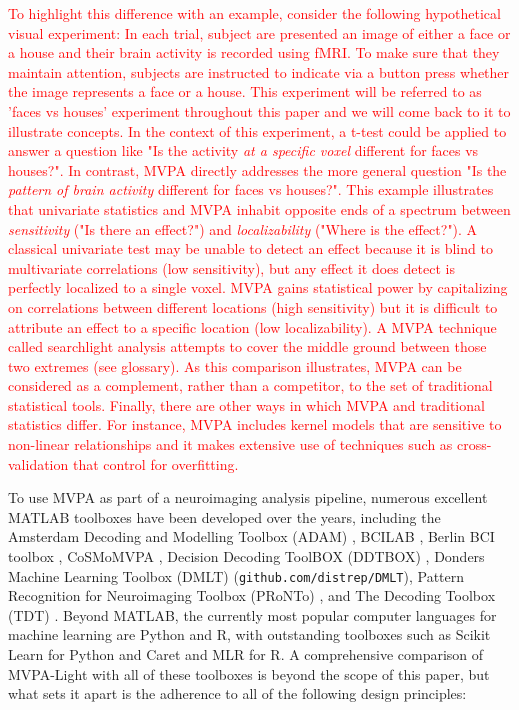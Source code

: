 \documentclass[utf8]{frontiersSCNS} %
\newcommand{\red}[1]{\textcolor{red}{#1}}
\begin{document}
\red{To highlight this difference with an example, consider the following hypothetical visual experiment: In each trial, subject are presented an image of either a face or a house and their brain activity is recorded using fMRI. To make sure that they maintain attention, subjects are instructed to indicate via a button press whether the image represents a face or a house. This experiment will be referred to as 'faces vs houses' experiment throughout this paper and we will come back to it to illustrate concepts. 
In the context of this experiment, a t-test could be applied to answer a question like "Is the activity \textit{at a specific voxel} different for faces vs houses?". In contrast, MVPA directly addresses the more general question "Is the \textit{pattern of brain activity} different for faces vs houses?". This example illustrates that univariate statistics and MVPA inhabit opposite ends of a spectrum between \textit{sensitivity} ("Is there an effect?") and \textit{localizability} ("Where is the effect?"). A classical univariate test may be unable to detect an effect because it is blind to multivariate correlations (low sensitivity), but any effect it does detect is perfectly localized to a single voxel. MVPA gains statistical power by capitalizing on correlations between different locations (high sensitivity) but it is difficult to attribute an effect to a specific location (low localizability). A MVPA technique called searchlight analysis attempts to cover the middle ground between those two extremes (see glossary). As this comparison illustrates, MVPA can be considered as a complement, rather than a competitor, to the set of traditional statistical tools. Finally, there are other ways in which MVPA and traditional statistics differ. For instance, MVPA includes kernel models that are sensitive to non-linear relationships and it makes extensive use of techniques such as cross-validation that control for overfitting.}

To use MVPA as part of a neuroimaging analysis pipeline, numerous excellent MATLAB toolboxes have been developed over the years, including the Amsterdam Decoding and Modelling Toolbox (ADAM) \citep{Fahrenfort2018FromADAM}, BCILAB \citep{Kothe2013BCILAB:Development}, Berlin BCI toolbox \citep{Blankertz2016TheControl}, CoSMoMVPA \citep{Oosterhof2016CoSMoMVPA:Octave}, Decision Decoding ToolBOX (DDTBOX) \citep{Bode2019ThePotentials}, Donders Machine Learning Toolbox (DMLT) (\texttt{github.com/distrep/DMLT}), Pattern Recognition for Neuroimaging Toolbox (PRoNTo) \citep{Schrouff2013PRoNTo:Toolbox}, and The Decoding Toolbox (TDT) \citep{Hebart2015TheData}. Beyond MATLAB, the currently most popular computer languages for machine learning are Python and R, with outstanding toolboxes such as Scikit Learn \citep{Pedregosa2011Scikit-learn:Python} for Python and Caret \citep{Kuhn2008BuildingPackage} and MLR \citep{Bischl2000Mlr:R} for R. A comprehensive comparison of MVPA-Light with all of these toolboxes is beyond the scope of this paper, but what sets it apart is the adherence to all of the following design principles:
\end{document}
